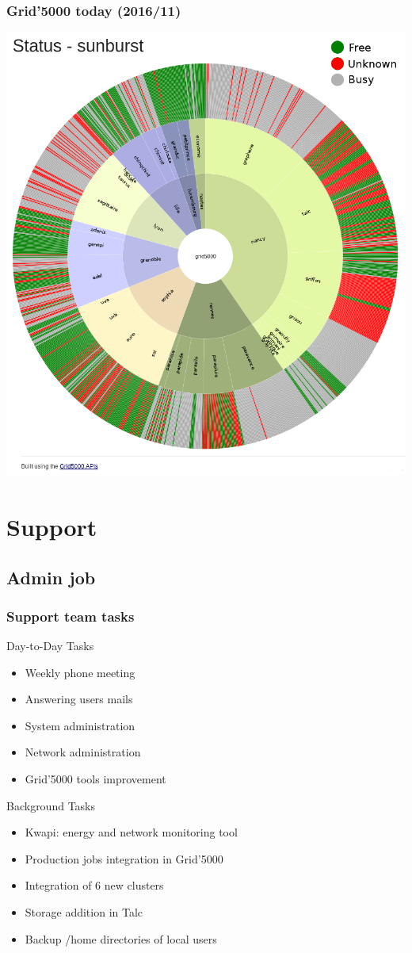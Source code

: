 \documentclass[11pt,compress,final]{beamer}
\begin{document}
\begin{frame}
\frametitle{Grid'5000 today (2016/11)}
\begin{center}
\includegraphics[scale=0.19]{figures/sunburst}
\end{center}
\end{frame}

\section{Support}
\subsection{Admin job}
\begin{frame}
\frametitle{Support team tasks}
Day-to-Day Tasks
\begin{itemize}
\item Weekly phone meeting
\item Answering users mails
\item System administration
\item Network administration
\item Grid'5000 tools improvement
\end{itemize}
Background Tasks
\begin{itemize}
\item Kwapi: energy and network monitoring tool
\item Production jobs integration in Grid'5000
\item Integration of 6 new clusters
\item Storage addition in Talc
\item Backup /home directories of local users
\end{itemize}
\end{frame}
\end{document}
